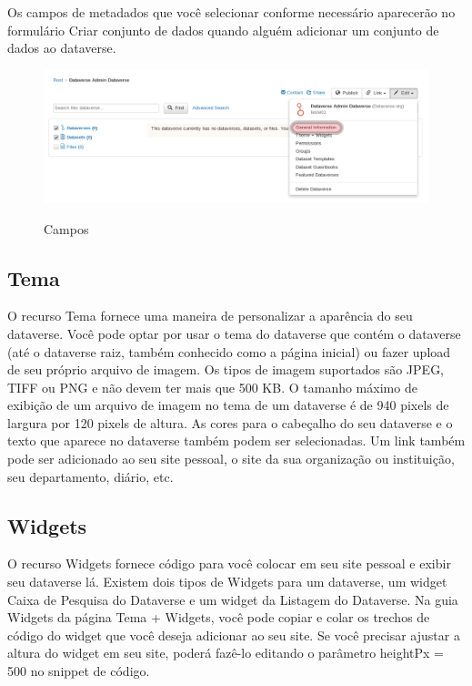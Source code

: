 \documentclass[12pt,hidelinks]{article}
\begin{document}
Os campos de metadados que você selecionar conforme necessário aparecerão no formulário Criar conjunto de dados quando alguém adicionar um conjunto de dados ao dataverse.

 \begin{figure}[H]
 \caption{Campos}
\centering
    \includegraphics[width=1.0\textwidth]{Prints/p5.png}
    \label{print5}
\end{figure}

    \subsection{Tema}
    
\qquad O recurso Tema fornece uma maneira de personalizar a aparência do seu dataverse. Você pode optar por usar o tema do dataverse que contém o dataverse (até o dataverse raiz, também conhecido como a página inicial) ou fazer upload de seu próprio arquivo de imagem. Os tipos de imagem suportados são JPEG, TIFF ou PNG e não devem ter mais que 500 KB. O tamanho máximo de exibição de um arquivo de imagem no tema de um dataverse é de 940 pixels de largura por 120 pixels de altura. As cores para o cabeçalho do seu dataverse e o texto que aparece no dataverse também podem ser selecionadas. Um link também pode ser adicionado ao seu site pessoal, o site da sua organização ou instituição, seu departamento, diário, etc.

    \subsection{Widgets}
    
\qquad O recurso Widgets fornece código para você colocar em seu site pessoal e exibir seu dataverse lá. Existem dois tipos de Widgets para um dataverse, um widget Caixa de Pesquisa do Dataverse e um widget da Listagem do Dataverse. Na guia Widgets da página Tema + Widgets, você pode copiar e colar os trechos de código do widget que você deseja adicionar ao seu site. Se você precisar ajustar a altura do widget em seu site, poderá fazê-lo editando o parâmetro heightPx = 500 no snippet de código.
    
\end{document}
